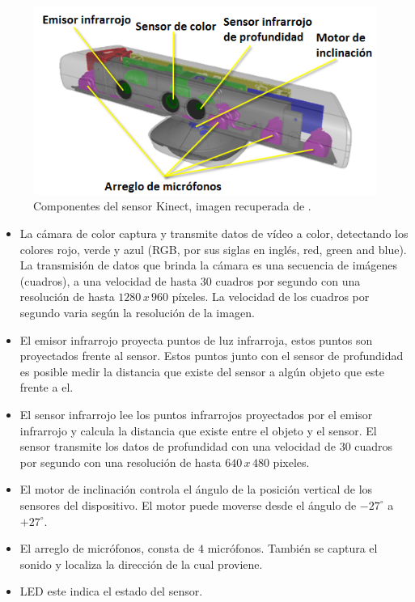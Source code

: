 \begin{figure}[h!]
\begin{center}
\includegraphics[scale=.6]{./Figures/sensor.png}
\end{center}
\caption{Componentes del sensor Kinect, imagen recuperada de \footnotemark{}.} 
\label{fig:KinectComponentes}
\end{figure}   


\begin{itemize}
\item La cámara de color captura y transmite datos de vídeo a color, detectando los colores rojo, verde y azul (RGB, por sus siglas en ingl\'es, red, green and blue). La transmisión de datos que brinda la cámara es una secuencia de imágenes (cuadros), a una velocidad de hasta $30$ cuadros por segundo con una resolución de hasta $1280\, x \, 960$ p\'ixeles. La velocidad de los cuadros por segundo varia según la resolución de la imagen.

\item El emisor infrarrojo proyecta puntos de luz infrarroja, estos puntos son proyectados frente al sensor. Estos puntos junto con el sensor de profundidad es posible medir la distancia que existe del sensor a algún objeto que este frente a el.  

\item El sensor infrarrojo lee los puntos infrarrojos proyectados por el emisor infrarrojo y calcula la distancia que existe entre el objeto y el sensor. El sensor transmite los datos de profundidad con una velocidad de $30$ cuadros por segundo con una resolución de hasta $640 \, x \, 480$ pixeles.   

\item El motor de inclinación controla el \'angulo de la posición vertical de los sensores del dispositivo. El motor puede moverse desde el \'angulo de $-27^ \circ$ a $+27^\circ$.  

\item El arreglo de micrófonos, consta de $4$ micrófonos. También se captura el sonido y localiza la dirección de la cual proviene. 

\item LED este indica el estado del sensor.
\end{itemize}

